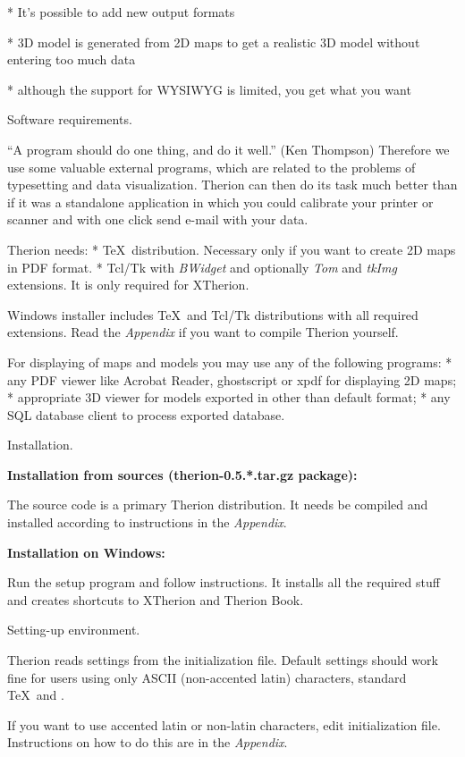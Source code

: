 * It's possible to add new output formats

* 3D model is generated from 2D maps to get a realistic 3D model 
  without entering too much data

* although the support for WYSIWYG is limited, you get what you want
\endlist

\subchapter Software requirements.

``A program should do one thing, and do it well.'' (Ken Thompson) 
Therefore we use some valuable external programs, which are related to the 
problems of typesetting and data visualization. Therion can then do its task 
much better than if it was a standalone application in which you could calibrate 
your printer or scanner and with one click send e-mail with your data.

Therion needs:
\list
* \TeX\ distribution.
  Necessary only if you want to create 2D maps in PDF format.
* Tcl/Tk with {\it BWidget} and optionally {\it Tom} and {\it tkImg} 
  extensions. It is only required for XTherion.
\endlist

Windows installer includes \TeX\ and Tcl/Tk distributions with all required 
extensions. Read the {\it Appendix} if you want to compile Therion yourself.

For displaying of maps and models you may use any of the following programs:
\list
* any PDF viewer like Acrobat Reader, ghostscript or xpdf for displaying  
  2D maps;
* appropriate 3D viewer for models exported in other than default format;
* any SQL database client to process exported database.
\endlist


\subchapter Installation.

{\bf Installation from sources (therion-0.5.*.tar.gz package):}

The source code is a primary Therion distribution. It needs be compiled 
and installed according to instructions in the {\it Appendix}.

{\bf Installation on Windows:}

Run the setup program and follow instructions. It installs all the required 
stuff and creates shortcuts to XTherion and Therion Book.


\subsubchapter Setting-up environment.

Therion reads settings from the initialization file. Default settings should 
work fine for users using only ASCII (non-accented latin) characters, 
standard \TeX\ and \MP. 

If you want to use accented latin or non-latin characters, edit initialization 
file. Instructions on how to do this are in the {\it Appendix}.


